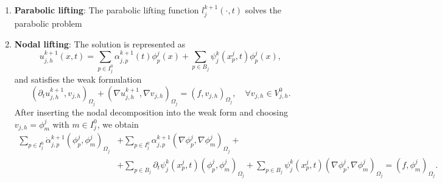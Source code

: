 \documentclass[a4paper, 11pt]{article}
\theoremstyle{remark}
\begin{document}
\begin{enumerate}[label = (\arabic*)]
\begin{equation*}
\end{equation*}
where $\Phi_{j, I}(x)\in\mathbb{R}^{|I^{0}_{j}|}$ and $\Phi_{j, B}(x)\in\mathbb{R}^{|B_{j}|}$ are defined by
\begin{equation*}
    \Phi_{j, I}(x) = [\Phi_{j}(x)]_{q}, \qquad \Phi_{j, B}(x) = [\Phi_{j}(x)]_{p}, \qquad q\in I^{0}_{j}, p\in B_{j},
\end{equation*}
then
\begin{equation*}
    u^{k+1}_{j, h}(x, t_{n+1}) = \Phi_{j, I}(x)^{T}\left(\boldsymbol{\alpha}_{j, I}^{n+1, k+1} + \boldsymbol{\ell}_{j}^{k+1}(t_{n+1})\right) + \Phi_{j, B}(x)^{T}\boldsymbol{\psi}_{j}^{k}(t_{n+1}),
\end{equation*}
or equivalently,
\begin{equation*}
    u^{k+1}_{j, h}(x, t_{n+1}) = \Phi_{j}(x)^{T}
    \begin{bmatrix}
        \boldsymbol{\alpha}_{j, I}^{n+1, k+1} + \boldsymbol{\ell}_{j}^{k+1}(t_{n+1})\\
        \boldsymbol{\psi}_{j}^{k}(t_{n+1})
    \end{bmatrix}.
\end{equation*}
\item \textbf{Parabolic lifting}: The parabolic lifting function $l_{j}^{k+1}(\cdot, t)$ solves the parabolic problem
\item \textbf{Nodal lifting}: The solution is represented as
\begin{equation*}
    u_{j, h}^{k+1}(x, t) = \sum_{p\in I^{0}_{j}} \alpha_{j, p}^{k+1}(t)\phi^{j}_{p}(x) + \sum_{p\in B_{j}}\psi_{j}^{k}(x^{j}_{p}, t)\phi^{j}_{p}(x),
\end{equation*}
and satisfies the weak formulation
\begin{equation*}
    \left(\partial_{t} u_{j, h}^{k+1}, v_{j, h}\right)_{\Omega_{j}} + \left(\nabla u_{j, h}^{k+1}, \nabla v_{j, h}\right)_{\Omega_{j}} = \left(f, v_{j, h}\right)_{\Omega_{j}}, \quad\forall v_{j, h}\in V_{j,h}^{0}.    
\end{equation*}
After inserting the nodal decomposition into the weak form and choosing
$v_{j, h} = \phi^{j}_{m}$ with $m\in I^{0}_{j}$, we obtain
\begin{align*}
    \sum_{p\in I^{0}_{j}} \dot{\alpha}_{j, p}^{k+1}\left(\phi^{j}_{p}, \phi^{j}_{m}\right)_{\Omega_{j}} &+ \sum_{p\in I^{0}_{j}} \alpha_{j, p}^{k+1}\left(\nabla\phi^{j}_{p}, \nabla\phi^{j}_{m}\right)_{\Omega_{j}} + \\
    & + \sum_{p\in B_{j}}\partial_{t}\psi_{j}^{k}(x^{j}_{p}, t)\left(\phi^{j}_{p}, \phi^{j}_{m}\right)_{\Omega_{j}} + \sum_{p\in B_{j}}\psi_{j}^{k}(x^{j}_{p}, t)\left(\nabla\phi^{j}_{p}, \nabla\phi^{j}_{m}\right)_{\Omega_{j}} = \left(f, \phi^{j}_{m}\right)_{\Omega_{j}}.

\end{align*}
\end{enumerate}
\end{document}
